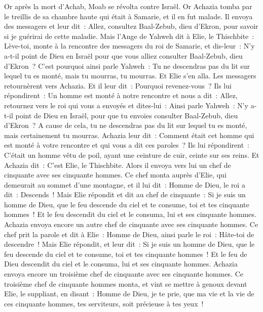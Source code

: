 \begin{multicols}{2}
\VerseOne{}Or après la mort d'Achab, Moab se révolta contre Israël.
Or Achazia tomba par le treillis de sa chambre haute qui était à Samarie, et il en fut malade. Il envoya des messagers et leur dit~: Allez, consultez Baal-Zebub, dieu d'Ekron, pour savoir si je guérirai de cette maladie.
Mais l'Ange de Yahweh dit à Elie, le Thischbite~: Lève-toi, monte à la rencontre des messagers du roi de Samarie, et dis-leur~: N'y a-t-il point de Dieu en Israël pour que vous alliez consulter Baal-Zebub, dieu d'Ekron~?
C'est pourquoi ainsi parle Yahweh~: Tu ne descendras pas du lit sur lequel tu es monté, mais tu mourras, tu mourras. Et Elie s'en alla.
Les messagers retournèrent vers Achazia. Et il leur dit~: Pourquoi revenez-vous~?
Ils lui répondirent~: Un homme est monté à notre rencontre et nous a dit~: Allez, retournez vers le roi qui vous a envoyés et dites-lui~: Ainsi parle Yahweh~: N'y a-t-il point de Dieu en Israël, pour que tu envoies consulter Baal-Zebub, dieu d'Ekron~? A cause de cela, tu ne descendras pas du lit sur lequel tu es monté, mais certainement tu mourras.
Achazia leur dit~: Comment était cet homme qui est monté à votre rencontre et qui vous a dit ces paroles~?
Ils lui répondirent~: C'était un homme vêtu de poil, ayant une ceinture de cuir, ceinte sur ses reins. Et Achazia dit~: C'est Elie, le Thischbite.
Alors il envoya vers lui un chef de cinquante avec ses cinquante hommes. Ce chef monta auprès d'Elie, qui demeurait au sommet d'une montagne, et il lui dit~: Homme de Dieu, le roi a dit~: Descends~!
Mais Elie répondit et dit au chef de cinquante~: Si je suis un homme de Dieu, que le feu descende du ciel et te consume, toi et tes cinquante hommes~! Et le feu descendit du ciel et le consuma, lui et ses cinquante hommes.
Achazia envoya encore un autre chef de cinquante avec ses cinquante hommes. Ce chef prit la parole et dit à Elie~: Homme de Dieu, ainsi parle le roi~: Hâte-toi de descendre~!
Mais Elie répondit, et leur dit~: Si je suis un homme de Dieu, que le feu descende du ciel et te consume, toi et tes cinquante hommes~! Et le feu de Dieu descendit du ciel et le consuma, lui et ses cinquante hommes.
Achazia envoya encore un troisième chef de cinquante avec ses cinquante hommes. Ce troisième chef de cinquante hommes monta, et vint se mettre à genoux devant Elie, le suppliant, en disant~: Homme de Dieu, je te prie, que ma vie et la vie de ces cinquante hommes, tes serviteurs, soit précieuse à tes yeux~!

\end{multicols}
